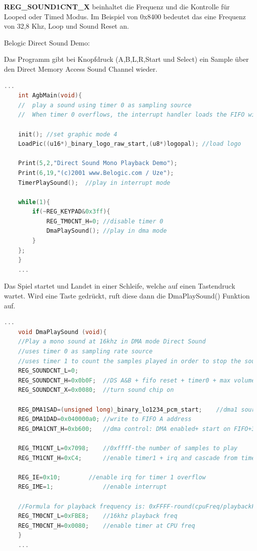 \documentclass[11pt,a4paper]{scrartcl}
\begin{document}
\textbf{REG\_SOUND1CNT\_X} beinhaltet die Frequenz und die Kontrolle f\"{u}r Looped oder Timed Modus. Im Beispiel von 0x8400 bedeutet das eine Frequenz von 32,8 Khz, Loop und Sound Reset an. 

\newpage

Belogic Direct Sound Demo:

Das Programm gibt bei Knopfdruck (A,B,L,R,Start und Select) ein Sample \"{u}ber den Direct Memory Access Sound Channel wieder.

\vspace{5mm}
\begin{lstlisting}[language=C++, caption={Belogic Direct Sound Demo}, label={list:directsound1}]
    ...
	int AgbMain(void){
	//	play a sound using timer 0 as sampling source
	//	When timer 0 overflows, the interrupt handler loads the FIFO with the next sample
	
	init(); //set graphic mode 4
	LoadPic((u16*)_binary_logo_raw_start,(u8*)logopal); //load logo

	Print(5,2,"Direct Sound Mono Playback Demo");
	Print(6,19,"(c)2001 www.Belogic.com / Uze");
	TimerPlaySound();  //play in interrupt mode

	while(1){
		if(~REG_KEYPAD&0x3ff){
			REG_TM0CNT_H=0;	//disable timer 0
			DmaPlaySound(); //play in dma mode
		}
	};
	}
	...
\end{lstlisting}

Das Spiel startet und Landet in einer Schleife, welche auf einen Tastendruck wartet. Wird eine Taste gedr\"{u}ckt, ruft diese dann die DmaPlaySound() Funktion auf.

\vspace{5mm}
\begin{lstlisting}[language=C++, caption={Belogic DmaPlaySound()}, label={list:directsound2}]
    ...
	void DmaPlaySound (void){
	//Play a mono sound at 16khz in DMA mode Direct Sound
	//uses timer 0 as sampling rate source
	//uses timer 1 to count the samples played in order to stop the sound 
	REG_SOUNDCNT_L=0;
	REG_SOUNDCNT_H=0x0b0F;  //DS A&B + fifo reset + timer0 + max volume to L and R
	REG_SOUNDCNT_X=0x0080;  //turn sound chip on
	
	REG_DMA1SAD=(unsigned long)_binary_lo1234_pcm_start;	//dma1 source
	REG_DMA1DAD=0x040000a0; //write to FIFO A address
	REG_DMA1CNT_H=0xb600;	//dma control: DMA enabled+ start on FIFO+32bit+repeat
	
	REG_TM1CNT_L=0x7098;	//0xffff-the number of samples to play
	REG_TM1CNT_H=0xC4;		//enable timer1 + irq and cascade from timer 0

	REG_IE=0x10;	  	//enable irq for timer 1 overflow
	REG_IME=1;				//enable interrupt
	
	//Formula for playback frequency is: 0xFFFF-round(cpuFreq/playbackFreq)
	REG_TM0CNT_L=0xFBE8;	//16khz playback freq
	REG_TM0CNT_H=0x0080; 	//enable timer at CPU freq 
	}
	...
\end{lstlisting}
\newpage
\end{document}

